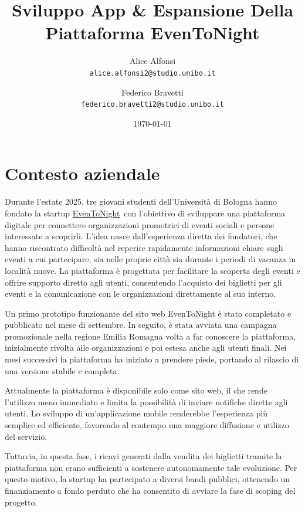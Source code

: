 \documentclass[11pt,a4paper]{article}
\title{\color{brand}\Huge\bfseries Sviluppo App \& Espansione Della Piattaforma EvenToNight}
\author{%
  Alice Alfonsi\\[1pt]{\small\texttt{alice.alfonsi2@studio.unibo.it}} \and
  Federico Bravetti\\[1pt]{\small\texttt{federico.bravetti2@studio.unibo.it}} \and
  }
\date{\today}
\begin{document}
\maketitle
\tableofcontents
\clearpage
{}\label{sec:report}
{}

\section{\texorpdfstring{{Contesto aziendale}}{Contesto aziendale}}\label{h.2e0gkqr4ogcf}

{Durante l’estate 2025, tre giovani studenti dell’Università di Bologna hanno fondato la startup }{\href{https://eventonight.site/it}{EvenToNight}}{~con l’obiettivo di sviluppare una piattaforma digitale per connettere organizzazioni promotrici di eventi sociali e persone interessate a scoprirli. L’idea nasce dall’esperienza diretta dei fondatori, che hanno riscontrato difficoltà nel reperire rapidamente informazioni chiare sugli eventi a cui partecipare, sia nelle proprie città sia durante i periodi di vacanza in località nuove. La piattaforma è progettata per facilitare la scoperta degli eventi e offrire supporto diretto agli utenti, consentendo l’acquisto dei biglietti per gli eventi e la comunicazione con le organizzazioni direttamente al suo interno.}

{Un primo prototipo funzionante del sito web EvenToNight è stato completato e pubblicato nel mese di settembre. In seguito, è stata avviata una campagna promozionale nella regione Emilia Romagna volta a far conoscere la piattaforma, inizialmente rivolta alle organizzazioni e poi estesa anche agli utenti finali. Nei mesi successivi la piattaforma ha iniziato a prendere piede, portando al rilascio di una versione stabile e completa.}

{Attualmente la piattaforma è disponibile solo come sito web, il che rende l’utilizzo meno immediato e limita la possibilità di inviare notifiche dirette agli utenti. Lo sviluppo di un’applicazione mobile renderebbe l’esperienza più semplice ed efficiente, favorendo al contempo una maggiore diffusione e utilizzo del servizio.}

{}

{Tuttavia, in questa fase, i ricavi generati dalla vendita dei biglietti tramite la piattaforma non erano sufficienti a sostenere autonomamente tale evoluzione. Per questo motivo, la startup ha partecipato a diversi bandi pubblici, ottenendo un finanziamento a fondo perduto che ha consentito di avviare la fase di scoping del progetto.}
\end{document}
